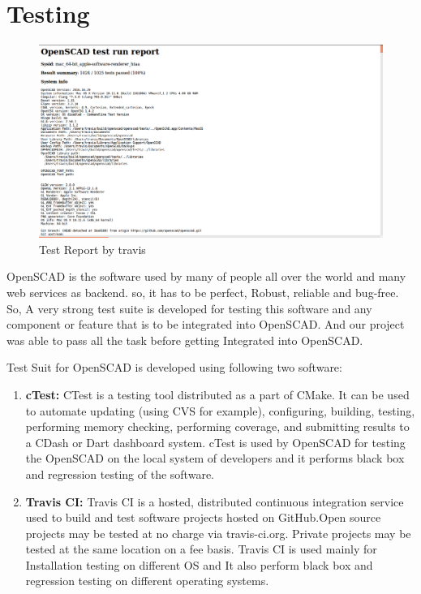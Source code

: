 \section{Testing}
\begin{figure}
    \centering
    \includegraphics[width=\linewidth]{images/travisTestReport}
    \caption{Test Report by travis}
    \label{fig:travisTestReport}
\end{figure}

OpenSCAD is the software used by many of people all over the world and many web services as backend. so, it has to be perfect, Robust, reliable and bug-free. So, A very strong test suite is developed for testing this software and any component or feature that is to be integrated into OpenSCAD. And our project was able to pass all the task before getting Integrated into OpenSCAD.

Test Suit for OpenSCAD is developed using following two software:

\begin{enumerate}
    \item \textbf{cTest:} CTest is a testing tool distributed as a part of CMake. It can be used to automate updating (using CVS for example), configuring, building, testing, performing memory checking, performing coverage, and submitting results to a CDash or Dart dashboard system.
    cTest is used by OpenSCAD for testing the OpenSCAD on the local system of developers and it performs black box and regression testing of the software.
   
    \item \textbf{Travis CI:} Travis CI is a hosted, distributed continuous integration service used to build and test software projects hosted on GitHub.Open source projects may be tested at no charge via travis-ci.org. Private projects may be tested at the same location on a fee basis.
    Travis CI is used mainly for Installation testing on different OS and It also perform  black box and regression testing on different operating systems.
   
\end{enumerate}


